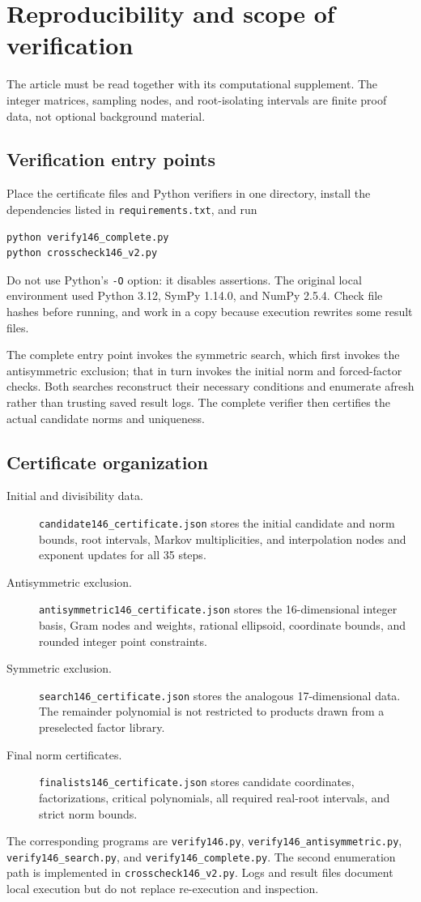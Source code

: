 \documentclass[11pt,a4paper]{article}
\newcommand{\file}[1]{{\small\nolinkurl{#1}}}
\begin{document}
\section{Reproducibility and scope of verification}
The article must be read together with its computational supplement. The integer matrices, sampling nodes, and root-isolating intervals are finite proof data, not optional background material.

\subsection{Verification entry points}
Place the certificate files and Python verifiers in one directory, install the dependencies listed in \file{requirements.txt}, and run
\begin{verbatim}
python verify146_complete.py
python crosscheck146_v2.py
\end{verbatim}
Do not use Python's \file{-O} option: it disables assertions. The original local environment used Python 3.12, SymPy 1.14.0, and NumPy 2.5.4. Check file hashes before running, and work in a copy because execution rewrites some result files.

The complete entry point invokes the symmetric search, which first invokes the antisymmetric exclusion; that in turn invokes the initial norm and forced-factor checks. Both searches reconstruct their necessary conditions and enumerate afresh rather than trusting saved result logs. The complete verifier then certifies the actual candidate norms and uniqueness.

\subsection{Certificate organization}
\begin{description}
\item[Initial and divisibility data.]
\file{candidate146_certificate.json} stores the initial candidate and norm bounds, root intervals, Markov multiplicities, and interpolation nodes and exponent updates for all 35 steps.
\item[Antisymmetric exclusion.]
\file{antisymmetric146_certificate.json} stores the 16-dimensional integer basis, Gram nodes and weights, rational ellipsoid, coordinate bounds, and rounded integer point constraints.
\item[Symmetric exclusion.]
\file{search146_certificate.json} stores the analogous 17-dimensional data. The remainder polynomial is not restricted to products drawn from a preselected factor library.
\item[Final norm certificates.]
\file{finalists146_certificate.json} stores candidate coordinates, factorizations, critical polynomials, all required real-root intervals, and strict norm bounds.
\end{description}
The corresponding programs are \file{verify146.py}, \file{verify146_antisymmetric.py}, \file{verify146_search.py}, and \file{verify146_complete.py}. The second enumeration path is implemented in \file{crosscheck146_v2.py}. Logs and result files document local execution but do not replace re-execution and inspection.
\end{document}
